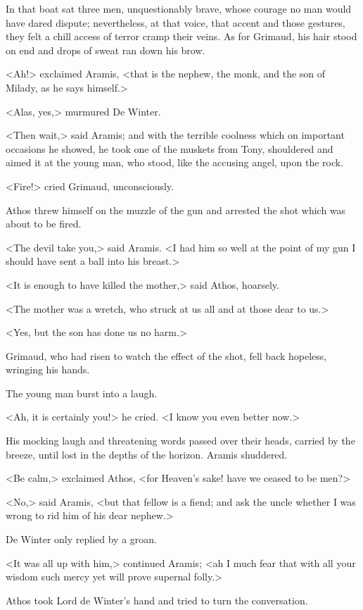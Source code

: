 In that boat sat three men, unquestionably brave, whose courage no man would have dared dispute; nevertheless, at that voice, that accent and those gestures, they felt a chill access of terror cramp their veins. As for Grimaud, his hair stood on end and drops of sweat ran down his brow.

<Ah!> exclaimed Aramis, <that is the nephew, the monk, and the son of Milady, as he says himself.>

<Alas, yes,> murmured De Winter.

<Then wait,> said Aramis; and with the terrible coolness which on important occasions he showed, he took one of the muskets from Tony, shouldered and aimed it at the young man, who stood, like the accusing angel, upon the rock.

<Fire!> cried Grimaud, unconsciously.

Athos threw himself on the muzzle of the gun and arrested the shot which was about to be fired.

<The devil take you,> said Aramis. <I had him so well at the point of my gun I should have sent a ball into his breast.>

<It is enough to have killed the mother,> said Athos, hoarsely.

<The mother was a wretch, who struck at us all and at those dear to us.>

<Yes, but the son has done us no harm.>

Grimaud, who had risen to watch the effect of the shot, fell back hopeless, wringing his hands.

The young man burst into a laugh.

<Ah, it is certainly you!> he cried. <I know you even better now.>

His mocking laugh and threatening words passed over their heads, carried by the breeze, until lost in the depths of the horizon. Aramis shuddered.

<Be calm,> exclaimed Athos, <for Heaven's sake! have we ceased to be men?>

<No,> said Aramis, <but that fellow is a fiend; and ask the uncle whether I was wrong to rid him of his dear nephew.>

De Winter only replied by a groan.

<It was all up with him,> continued Aramis; <ah I much fear that with all your wisdom such mercy yet will prove supernal folly.>

Athos took Lord de Winter's hand and tried to turn the conversation.

